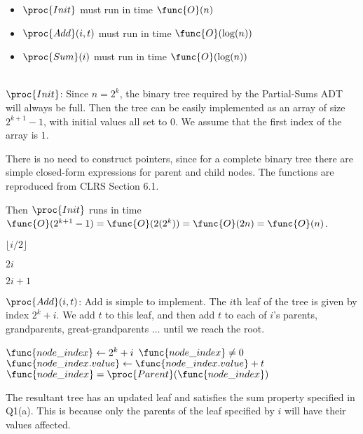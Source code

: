 \documentclass[11pt, answers]{exam}
\theoremstyle{plain}
\theoremstyle{definition}
\begin{document}
\begin{questions}
\begin{parts}
\begin{itemize}
\item $\proc{Init}$ must run in time $\func{O}(n)$
\item $\proc{Add}(i,t)$ must run in time $\func{O}(\log(n))$
\item $\proc{Sum}(i)$ must run in time $\func{O}(\log(n))$
\end{itemize}

\begin{solution}\\

$\proc{Init}$:
Since $n = 2^k$, the binary tree required by the Partial-Sums ADT will always be full. Then the tree can be easily implemented as an array of size $2^{k+1} - 1$, with initial values all set to $0$. We assume that the first index of the array is $1$.

There is no need to construct pointers, since for a complete binary tree there are simple closed-form expressions for parent and child nodes. The functions are reproduced from CLRS Section 6.1.

Then $\proc{Init}$ runs in time $\func{O}(2^{k+1} - 1) = \func{O}(2(2^k)) = \func{O}(2n) = \func{O}(n)$.

\begin{codebox}
\li 		\Return $\lfloor i/2 \rfloor$
\end{codebox}

\begin{codebox}
\li 		\Return $2i$
\end{codebox}

\begin{codebox}
\li 		\Return $2i + 1$
\end{codebox}

$\proc{Add}(i,t)$:
Add is simple to implement. The $i$th leaf of the tree is given by index $2^k + i$. We add $t$ to this leaf, and then add $t$ to each of $i$'s parents, grandparents, great-grandparents $\ldots$ until we reach the root.

\begin{codebox}
\li $\func{node\_index} \gets 2^k + i$
\li \While $\func{node\_index} \neq 0$
\li \Do $\func{node\_index.value} \gets \func{node\_index.value} + t$
\li $\func{node\_index} = \proc{Parent}(\func{node\_index})$
\End
\end{codebox}

The resultant tree has an updated leaf and satisfies the sum property specified in Q1(a). This is because only the parents of the leaf specified by $i$ will have their values affected.


\end{solution}
\end{parts}
\end{questions}
\end{document}
